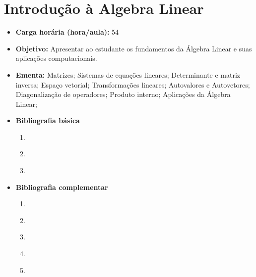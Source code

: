 \documentclass[
	10pt,				%
	openright,			%
	twoside,			%
	a4paper,			%
	english,			%
	french,				%
	brazil,				%
	sumario=tradicional
]{abntex2}
\begin{document}
\section*{Introdução à Algebra Linear}\label{2_algebra}
\begin{itemize}
	\item \textbf{Carga horária (hora/aula):} 54
	\item \textbf{Objetivo:} Apresentar ao estudante os fundamentos da Álgebra Linear e suas aplicações computacionais.
	\item \textbf{Ementa:} 
	Matrizes; 
	Sistemas de equações lineares; 
	Determinante e matriz inversa; 
	Espaço vetorial; 
	Transformações lineares; 
	Autovalores e Autovetores; 
	Diagonalização de operadores; 
	Produto interno;
	Aplicações da Álgebra Linear;
	\item \textbf{Bibliografia básica}
	\begin{enumerate}
		\item \cite{anton2001algebra}
		\item \cite{kolman2006introduccao}
		\item \cite{lipschutz1992algebra}
	\end{enumerate}
	\item \textbf{Bibliografia complementar}
	\begin{enumerate}
		\item \cite{boldrini1980algebra}
		\item \cite{winterle1987algebra}
		\item \cite{iezzi2013fundamentos01}
		\item \cite{iezzi2013fundamentos06}
		\item \cite{giovanni2002matematica}
	\end{enumerate}	
\end{itemize}




\newpage
\end{document}
